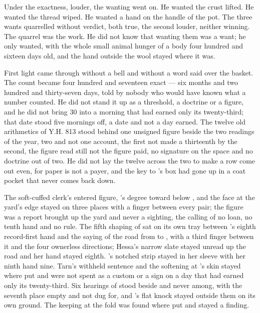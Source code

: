 Under the exactness, louder, the wanting went on. He wanted the crust lifted. He wanted the thread wiped. He wanted a hand on the handle of the pot. The three wants quarrelled without verdict, both true, the second louder, neither winning. The quarrel was the work. He did not know that wanting them was a want; he only wanted, with the whole small animal hunger of a body four hundred and sixteen days old, and the hand outside the wool stayed where it was.

First light came through  without a bell and without a word said over the basket. The count became four hundred and seventeen exact --- six months and two hundred and thirty-seven days, told by nobody who would have known what a number counted. He did not stand it up as a threshold, a doctrine or a figure, and he did not bring  30 into a morning that had earned only its twenty-third; that date stood five mornings off, a date and not a day earned. The twelve old arithmetics of Y.H. 813 stood behind one unsigned figure beside the two readings of the year, two and not one account, the first not made a thirteenth by the second, the figure read still not the figure paid, no signature on the space and no doctrine out of two. He did not lay the twelve across the two to make a row come out even, for paper is not a payer, and the key to 's box had gone up  in a coat pocket that never comes back down.

The soft-cuffed clerk's entered figure, 's degree toward  below , and the face at the yard's edge stayed on three places with a finger between every pair; the figure was a report brought up the yard and never a sighting, the calling of no loan, no tenth hand and no rule. The fifth shaping of  sat on its own tray between 's eighth record-first hand and the saying of the road from  to , with a third finger between it and the four ownerless directions; Hessa's narrow slate stayed unread up the road and her hand stayed eighth. 's notched strip stayed in her sleeve with her ninth hand nine. Tarn's withheld sentence and the softening at 's skin stayed where put and were not spent as a custom or a sign on a day that had earned only its twenty-third. Six hearings of  stood beside and never among, with the seventh place empty and not dug for, and 's flat knock stayed outside them on its own ground. The keeping at the fold was found where put and stayed a finding.

